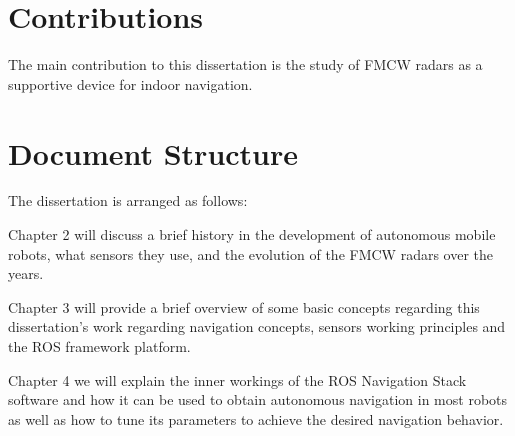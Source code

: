\section{Contributions}
The main contribution to this dissertation is the study of \ac{FMCW} radars as a supportive device for indoor navigation.
\section{Document Structure}
The dissertation is arranged as follows:

Chapter 2 will discuss a brief history in the development of autonomous mobile robots, what sensors they use, and the evolution of the \ac{FMCW} radars over the years.

Chapter 3 will provide a brief overview of some basic concepts regarding this dissertation's work regarding navigation concepts, sensors working principles and the ROS framework platform.


Chapter 4 we will explain the inner workings of the ROS Navigation Stack software and how it can be used to obtain autonomous navigation in most robots as well as how to tune its parameters to achieve the desired navigation behavior.




